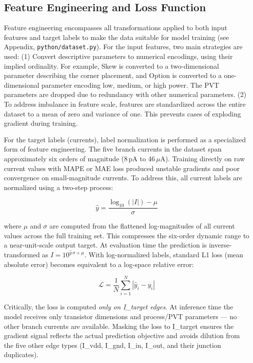 \documentclass[10pt,twocolumn,letterpaper]{article}
\begin{document}
\subsection{Feature Engineering and Loss Function}
\label{subsec:feature_engineering}

Feature engineering encompasses all transformations applied to both input features and target labels to make the data suitable for model training (see Appendix, \texttt{python/dataset.py}). For the input features, two main strategies are used: (1) Convert descriptive parameters to numerical encodings, using their implied ordinality. For example, Skew is converted to a two-dimensional parameter describing the corner placement, and Option is converted to a one-dimensional parameter encoding low, medium, or high power. The PVT parameters are dropped due to redundancy with other numerical parameters. (2) To address imbalance in feature scale, features are standardized across the entire dataset to a mean of zero and variance of one. This prevents cases of exploding gradient during training.

For the target labels (currents), label normalization is performed as a specialized form of feature engineering. The five branch currents in the dataset span approximately six orders of magnitude (8\,pA to 46\,$\mu$A). Training directly on raw current values with MAPE or MAE loss produced unstable gradients and poor convergence on small-magnitude currents. To address this, all current labels are normalized using a two-step process:

\begin{equation}
  \hat{y} = \frac{\log_{10}(|I|) - \mu}{\sigma}
\end{equation}

where $\mu$ and $\sigma$ are computed from the flattened log-magnitudes of all current values across the full training set. This compresses the six-order dynamic range to a near-unit-scale output target. At evaluation time the prediction is inverse-transformed as $I = 10^{\hat{y}\,\sigma + \mu}$.  With log-normalized labels, standard L1 loss (mean absolute error) becomes equivalent to a log-space relative error:

\begin{equation}
  \mathcal{L} = \frac{1}{N}\sum_{i=1}^{N} \left| \hat{y}_i - y_i \right|
\end{equation}

Critically, the loss is computed \textit{only on I\_target edges}. At inference time the model receives only transistor dimensions and process/PVT parameters — no other branch currents are available. Masking the loss to I\_target ensures the gradient signal reflects the actual prediction objective and avoids dilution from the five other edge types (I\_vdd, I\_gnd, I\_in, I\_out, and their junction duplicates).
\end{document}
